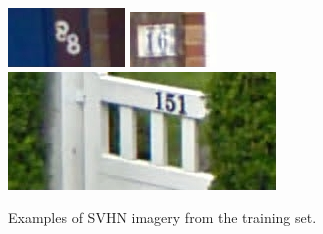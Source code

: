 \documentclass[12pt]{article}
\begin{document}
\begin{figure}
	\includegraphics[width=\linewidth]{images/train/1046.png}
\endminipage\hfill
{}
	\includegraphics[width=\linewidth]{images/train/10.png}
\endminipage\hfill
{}
	\includegraphics[width=\linewidth]{images/train/20.png}
\endminipage\hfill
\caption{Examples of SVHN imagery from the training set.}
\label{fig:example_imagery}
\end{figure}
\end{document}
